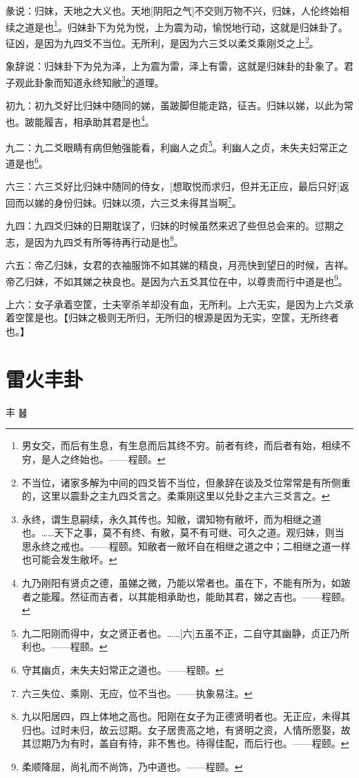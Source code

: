 \documentclass[12pt,oneside]{book}
\begin{document}
彖说：归妹，天地之大义也。天地[阴阳之气]不交则万物不兴，归妹，人伦终始相续之道是也\footnote{男女交，而后有生息，有生息而后其终不穷。前者有终，而后者有始，相续不穷，是人之终始也。——程颐。}。归妹卦下为兑为悦，上为震为动，愉悦地行动，这就是归妹卦了。征凶，是因为九四爻不当位。无所利，是因为六三爻以柔爻乘刚爻之上\footnote{不当位，诸家多解为中间的四爻皆不当位，但彖辞在谈及爻位常常是有所侧重的，这里以震卦之主九四爻言之。柔乘刚这里以兑卦之主六三爻言之。}。

象辞说：归妹卦下为兑为泽，上为震为雷，泽上有雷，这就是归妹卦的卦象了。君子观此卦象而知道永终知敝\footnote{永终，谓生息嗣续，永久其传也。知敝，谓知物有敝坏，而为相继之道也。……天下之事，莫不有终、有敝，莫不有可继、可久之道。观归妹，则当思永终之戒也。——程颐。知敝者一敝坏自在相继之道之中；二相继之道一样也可能会发生敝坏。}的道理。

初九：初九爻好比归妹中随同的娣，虽跛脚但能走路，征吉。归妹以娣，以此为常也。跛能履吉，相承助其君是也\footnote{九乃刚阳有贤贞之德，虽娣之微，乃能以常者也。虽在下，不能有所为，如跛者之能履。然征而吉者，以其能相承助也，能助其君，娣之吉也。——程颐。}。

九二：九二爻眼睛有病但勉强能看，利幽人之贞\footnote{九二阳刚而得中，女之贤正者也。……[六]五虽不正，二自守其幽静，贞正乃所利也。——程颐。}。利幽人之贞，未失夫妇常正之道是也\footnote{守其幽贞，未失夫妇常正之道也。——程颐。}。

六三：六三爻好比归妹中随同的侍女，[想取悦而求归，但并无正应，最后只好]返回而以娣的身份归妹。归妹以须，六三爻未得其当啊\footnote{六三失位、乘刚、无应，位不当也。——执象易注。}。

九四：九四爻归妹的日期耽误了，归妹的时候虽然来迟了些但总会来的。愆期之志，是因为九四爻有所等待再行动是也\footnote{九以阳居四，四上体地之高也。阳刚在女子为正德贤明者也。无正应，未得其归也。过时未归，故云愆期。女子居贵高之地，有贤明之资，人情所愿娶，故其愆期乃为有时，盖自有待，非不售也。待得佳配，而后行也。——程颐。}。

六五：帝乙归妹，女君的衣袖服饰不如其娣的精良，月亮快到望日的时候，吉祥。帝乙归妹，不如其娣之袂良也。是因为六五爻其位在中，以尊贵而行中道是也\footnote{柔顺降屈，尚礼而不尚饰，乃中道也。——程颐。}。

上六：女子承着空筐，士夫宰杀羊却没有血，无所利。上六无实，是因为上六爻承着空筐是也。【归妹之极则无所归，无所归的根源是因为无实，空筐，无所终者也。】



\chapter{雷火丰卦}
丰 {\Large ䷶}
\end{document}
